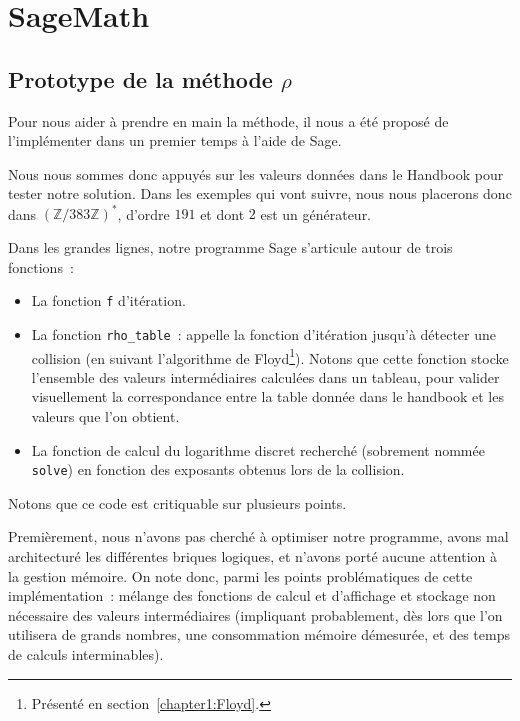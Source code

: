     \section{SageMath}
        \subsection{Prototype de la méthode \texorpdfstring{$\rho$}{Rho}}
        Pour nous aider à prendre en main la méthode, il nous a été proposé de l'implémenter dans un premier temps à l'aide de Sage.

        Nous nous sommes donc appuyés sur les valeurs données dans le Handbook pour tester notre solution.
        Dans les exemples qui vont suivre, nous nous placerons donc dans ${(\mathbb{Z}/383\mathbb{Z})}^*$, d'ordre $191$ et dont $2$ est un générateur.

        Dans les grandes lignes, notre programme Sage s'articule autour de trois fonctions~:
        \begin{itemize}
            \item La fonction \lstinline{f} d'itération.
            \item La fonction \lstinline{rho_table}~: appelle la fonction d'itération jusqu'à détecter une collision (en suivant l'algorithme de Floyd\footnote{Présenté en section~\ref{chapter1:Floyd}.}). Notons que cette fonction stocke l'ensemble des valeurs intermédiaires calculées dans un tableau, pour valider visuellement la correspondance entre la table donnée dans le handbook\autocite[107]{handbook} et les valeurs que l'on obtient.
            \item La fonction de calcul du logarithme discret recherché (sobrement nommée \lstinline{solve}) en fonction des exposants obtenus lors de la collision.
        \end{itemize}

        Notons que ce code est critiquable sur plusieurs points.

        Premièrement, nous n'avons pas cherché à optimiser notre programme, avons mal architecturé les différentes briques logiques, et n'avons porté aucune attention à la gestion mémoire.
        On note donc, parmi les points problématiques de cette implémentation~: mélange des fonctions de calcul et d'affichage et stockage non nécessaire des valeurs intermédiaires (impliquant probablement, dès lors que l'on utilisera de grands nombres, une consommation mémoire démesurée, et des temps de calculs interminables).

